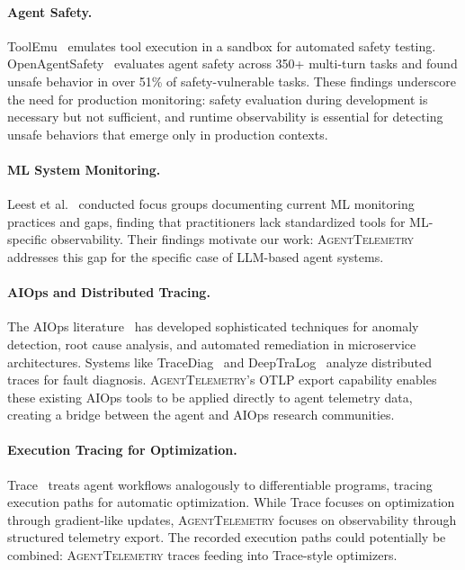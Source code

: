 \documentclass[sigconf,nonacm]{acmart}
\begin{document}
\paragraph{Agent Safety.}
ToolEmu~\cite{toolemu} emulates tool execution in a sandbox for
automated safety testing.  OpenAgentSafety~\cite{openagentsafety}
evaluates agent safety across 350+ multi-turn tasks and found unsafe
behavior in over 51\% of safety-vulnerable tasks.  These findings
underscore the need for production monitoring: safety evaluation during
development is necessary but not sufficient, and runtime observability
is essential for detecting unsafe behaviors that emerge only in
production contexts.

\paragraph{ML System Monitoring.}
Leest et al.~\cite{ml_monitoring} conducted focus groups documenting
current ML monitoring practices and gaps, finding that practitioners
lack standardized tools for ML-specific observability.  Their findings
motivate our work: \textsc{AgentTelemetry} addresses this gap for the
specific case of LLM-based agent systems.

\paragraph{AIOps and Distributed Tracing.}
The AIOps literature~\cite{aiops_survey, opsagent} has developed
sophisticated techniques for anomaly detection, root cause analysis,
and automated remediation in microservice architectures.  Systems like
TraceDiag~\cite{tracediag} and DeepTraLog~\cite{deeptralog} analyze
distributed traces for fault diagnosis.  \textsc{AgentTelemetry}'s OTLP
export capability enables these existing AIOps tools to be applied
directly to agent telemetry data, creating a bridge between the agent
and AIOps research communities.

\paragraph{Execution Tracing for Optimization.}
Trace~\cite{trace_opt} treats agent workflows analogously to
differentiable programs, tracing execution paths for automatic
optimization.  While Trace focuses on optimization through gradient-like
updates, \textsc{AgentTelemetry} focuses on observability through
structured telemetry export.  The recorded execution paths could
potentially be combined: \textsc{AgentTelemetry} traces feeding into
Trace-style optimizers.
\end{document}
